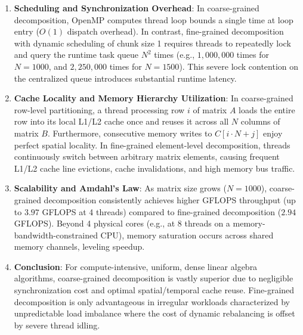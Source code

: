 \documentclass[12pt]{article}
\begin{document}
\begin{enumerate}
    \item \textbf{Scheduling and Synchronization Overhead}: 
    In coarse-grained decomposition, OpenMP computes thread loop bounds a single time at loop entry ($O(1)$ dispatch overhead). In contrast, fine-grained decomposition with dynamic scheduling of chunk size 1 requires threads to repeatedly lock and query the runtime task queue $N^2$ times (e.g., $1{,}000{,}000$ times for $N=1000$, and $2{,}250{,}000$ times for $N=1500$). This severe lock contention on the centralized queue introduces substantial runtime latency.
    
    \item \textbf{Cache Locality and Memory Hierarchy Utilization}:
    In coarse-grained row-level partitioning, a thread processing row $i$ of matrix $A$ loads the entire row into its local L1/L2 cache once and reuses it across all $N$ columns of matrix $B$. Furthermore, consecutive memory writes to $C[i \cdot N + j]$ enjoy perfect spatial locality. In fine-grained element-level decomposition, threads continuously switch between arbitrary matrix elements, causing frequent L1/L2 cache line evictions, cache invalidations, and high memory bus traffic.
    
    \item \textbf{Scalability and Amdahl's Law}:
    As matrix size grows ($N=1000$), coarse-grained decomposition consistently achieves higher GFLOPS throughput (up to $3.97$ GFLOPS at 4 threads) compared to fine-grained decomposition ($2.94$ GFLOPS). Beyond 4 physical cores (e.g., at 8 threads on a memory-bandwidth-constrained CPU), memory saturation occurs across shared memory channels, leveling speedup.
    
    \item \textbf{Conclusion}:
    For compute-intensive, uniform, dense linear algebra algorithms, coarse-grained decomposition is vastly superior due to negligible synchronization cost and optimal spatial/temporal cache reuse. Fine-grained decomposition is only advantageous in irregular workloads characterized by unpredictable load imbalance where the cost of dynamic rebalancing is offset by severe thread idling.
\end{enumerate}
\end{document}
